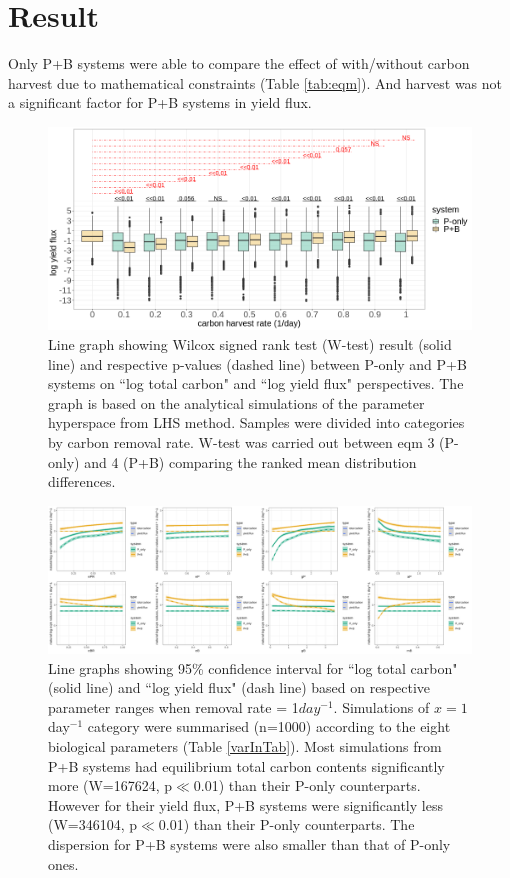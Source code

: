 \documentclass[../thesis.tex]{subfiles} %
\begin{document}
\section{Result}
Only P+B systems were able to compare the effect of with/without carbon harvest due to mathematical constraints (Table \ref{tab:eqm}).  And harvest was not a significant factor for P+B systems in yield flux.

\begin{figure}[H]
    \centering
    \includegraphics[width=\linewidth]{../result/Wilcox.png}
    \caption[Wilcox test summary]{Line graph showing Wilcox signed rank test (W-test) result (solid line) and respective p-values (dashed line) between P-only and P+B systems on ``log total carbon" and ``log yield flux" perspectives.  {\scriptsize The graph is based on the analytical simulations of the parameter hyperspace from LHS method.  Samples were divided into categories by carbon removal rate.  W-test was carried out between eqm 3 (P-only) and 4 (P+B) comparing the ranked mean distribution differences.}}
    \label{fig:wilcox}
\end{figure}

\begin{figure}[H]
    \centering
    \includegraphics[width=\linewidth]{../result/var_10.png}
    \caption[95\% distribution for $x=1day^{-1}$]{Line graphs showing 95\% confidence interval for ``log total carbon" (solid line) and ``log yield flux" (dash line) based on respective parameter ranges when removal rate = 1$day^{-1}$.  {\scriptsize Simulations of $x=1$day$^{-1}$ category were summarised (n=1000) according to the eight biological parameters (Table \ref{varInTab}).  Most simulations from P+B systems had equilibrium total carbon contents significantly more (W=167624, p$\ll$0.01) than their P-only counterparts.  However for their yield flux, P+B systems were significantly less (W=346104, p$\ll$0.01) than their P-only counterparts.  The dispersion for P+B systems were also smaller than that of P-only ones.}}
    \label{fig:v10}
\end{figure}
\end{document}
